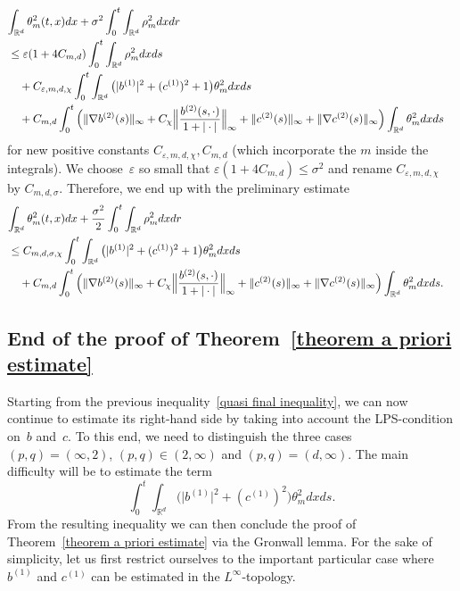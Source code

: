 \documentclass[a4paper,10pt]{article}
\newcommand\1{\mathbbm{1}}
\newcommand{\eps}{\varepsilon}
\numberwithin{equation}{section}
\begin{document}
\begin{align*}
\lefteqn{ \int_{\mathbb{R}^{d}}\theta_{m}^{2}(t,x)dx+\sigma^{2}\int_{0}^{t} 
\int_{\mathbb{R}^{d}}\rho_{m}^{2}dxdr} \\
&  \leq \eps(1+4C_{m,d})  \int_{0}^{t}\int_{\mathbb{R}^{d} 
}\rho_{m}^{2}dxds\\
& \quad {} +C_{\eps,m,d,\chi}\int_{0}^{t}\int_{\mathbb{R}^{d}} \big(\vert b^{(1)  }\vert ^{2}+(c^{(1)  })
^{2} +1 \big)  \theta_{m}^{2}dxds\\
& \quad {} +C_{m,d} \int_{0}^{t} \Big( \Vert \nabla b^{(2)}(s) \Vert_{\infty} + C_{\chi} \Big\Vert \frac{b^{(2)}(s,\cdot)}{1+\vert \cdot\vert} \Big\Vert_{\infty} + \Vert c^{(2)}(s)\Vert_{\infty} + \Vert\nabla c^{(2)}(s) \Vert_{\infty} \Big) \int_{\mathbb{R}^{d}}\theta_{m}^{2}dxds
\end{align*}
for new positive constants $C_{\eps,m,d,\chi},C_{m,d}$ (which incorporate the $m$ inside the integrals). We choose~$\eps$ so small
that $\eps(1+4C_{m,d})  \leq\sigma^{2}$ and rename $C_{\eps,m,d,\chi}$ by $C_{m,d,\sigma}$. Therefore, we end up with the preliminary estimate
\begin{align}
\label{quasi final inequality}
\lefteqn{ \int_{\mathbb{R}^{d}}\theta_{m}^{2}(t,x)dx+\frac{\sigma^{2}}{2}\int_{0} 
^{t}\int_{\mathbb{R}^{d}}\rho_{m}^{2}dxdr } \\
&  \leq C_{m,d,\sigma,\chi} \int_{0}^{t} \int_{\mathbb{R}^{d}} \big(\vert b^{(1)}\vert ^{2}+(c^{(1)})^{2} +1\big) \theta_{m}^{2} dxds \nonumber \\& \quad {} +C_{m,d} \int_{0}^{t} \Big( \Vert \nabla b^{(2)}(s)  \Vert _{\infty}+C_{\chi} \Big\Vert \frac{b^{(2)}(s,\cdot)}{1+\vert \cdot\vert } \Big\Vert_{\infty}+ \Vert c^{(2)}(s)  \Vert _{\infty}+\Vert \nabla c^{(2)}(s) \Vert_{\infty} \Big) \int_{\mathbb{R}^{d}} \theta_{m}^{2} dxds . \nonumber
\end{align}

\subsection{End of the proof of Theorem~\ref{theorem a priori estimate}}

Starting from the previous inequality~\eqref{quasi final inequality}, we can now continue to estimate its right-hand side by taking into account the LPS-condition on~$b$ and~$c$. To this end, we need to distinguish the three cases $(p,q)=(\infty,2)$, $(p,q) \in (2,\infty)$ and $(p,q) =(d,\infty)$. The main difficulty will be to estimate the term
\begin{equation*}
\int_{0}^{t} \int_{\mathbb{R}^{d}} \big(\vert b^{(1)}\vert ^{2}+(c^{(1)})^{2} \big) \theta_{m}^{2} dxds .
\end{equation*}
From the resulting inequality we can then conclude the proof of Theorem~\ref{theorem a priori estimate} via the Gronwall lemma. For the sake of simplicity, let us first restrict ourselves to the important particular case where $b^{(1)}$ and $c^{(1)}$ can be estimated in the $L^{\infty}$-topology.
\end{document}
